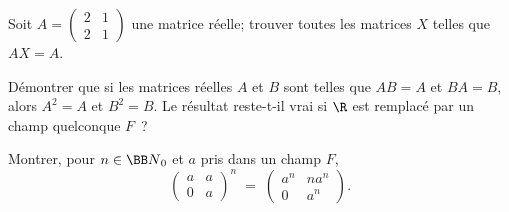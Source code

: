 \documentclass[12pt,french,oneside,a4paper]{memoir} %
\begin{document}
\begin{exo}
Soit $A= \left( \begin{array}{cc} 2 &1 \\2 &1 \end{array} \right)$ une matrice réelle;  trouver toutes les matrices $X$ telles que $AX=A$.
\end{exo}
\begin{exo}
Démontrer que si les matrices réelles $A$ et $B$ sont telles que $AB=A$ et $BA=B$, alors $A^2=A$ et $B^2=B$.  Le résultat reste-t-il vrai si $\R$ est remplacé par un champ quelconque $F$~?
\end{exo}
\begin{exo}
Montrer, pour $n \in {\BB N}_0$ et $a$ pris dans un champ $F$, 
\begin{equation*}
 \left( \begin{array}{cc}
a & a \\
0 &a \end{array} \right)^n \;=\; 
\left( \begin{array}{cc}
a^n &n a^n \\
0 &a^n
\end{array} \right).
\end{equation*}
\end{exo}
\end{document}
